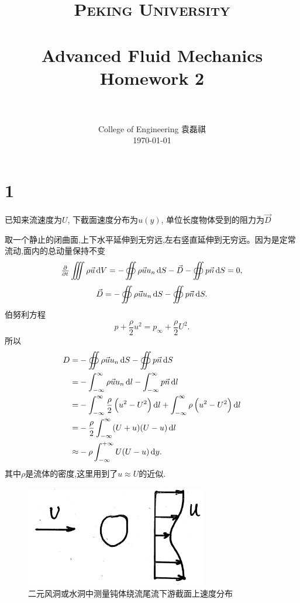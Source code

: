 \documentclass[12pt]{article}
\title{
		\vspace{-1in} 	
		\usefont{OT1}{bch}{b}{n}
		\normalfont \normalsize \textsc{\LARGE Peking University}\\[1cm] %
		\horrule{0.5pt} \\[0.5cm]
		\huge \bfseries{Advanced Fluid Mechanics Homework 2} \\
		\horrule{2pt} \\[0.5cm]
}
\author{
		\normalfont 								\normalsize
		College of Engineering \quad 2001111690  \quad 袁磊祺\\	\normalsize
        \today
}
\date{}
\begin{document}


\maketitle

\section{1}



已知来流速度为$U$, 下截面速度分布为$u(y)$, 单位长度物体受到的阻力为$\vec{D}$

取一个静止的闭曲面,上下水平延伸到无穷远,左右竖直延伸到无穷远。因为是定常流动,面内的总动量保持不变
\begin{equation}
	\pd{}{t} \iiint \rho \vec{u} \dif V = - \oiint \rho \vec{u} u_n \dif S - \vec{D} - \oiint p \vec{n} \dif S = 0,
\end{equation}
\begin{equation}
	\vec{D} = - \oiint \rho \vec{u} u_n \dif S - \oiint p \vec{n} \dif S.
\end{equation}
伯努利方程
\begin{equation}
	p + \frac{\rho}{2} u^2 = p_{\infty} + \frac{\rho}{2} U^2.
\end{equation}
所以
\begin{equation}
	\begin{aligned}
		D = & - \oiint \rho \vec{u} u_n \dif S - \oiint p \vec{n} \dif S\\
		= & - \int_{-\infty}^{\infty} \rho \vec{u} u_n \dif l - \int_{-\infty}^{\infty} p \vec{n} \dif l\\
		= & - \int_{-\infty}^{\infty} \frac{\rho}{2} \left(u^2 - U^2\right) \dif l + \int_{-\infty}^{\infty} \rho \left(u^2 - U^2\right) \dif l\\
		= & - \frac{\rho}{2} \int_{-\infty}^{\infty} (U+u)(U-u) \dif l\\
		\approx & - \rho \int_{-\infty}^{+\infty} U(U-u) \dif y.
	\end{aligned}
\end{equation}
其中$\rho$是流体的密度,这里用到了$u\approx U$的近似.

\begin{figure}[htp]
	\centering
	\includegraphics[width=8cm]{1.jpeg}
	\caption{二元风洞或水洞中测量钝体绕流尾流下游截面上速度分布}
	\label{fig:1}
\end{figure}
\end{document}
